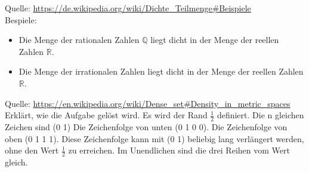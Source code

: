 \documentclass[11pt]{article}
\newenvironment{reflection}[2][Reflection]{\begin{trivlist}
\item[\hskip \labelsep {\bfseries #1}\hskip \labelsep {\bfseries #2.}]}{\end{trivlist}}
\begin{document}
\begin{reflection}{1.2}
Quelle: 
\url{https://de.wikipedia.org/wiki/Dichte_Teilmenge#Beispiele}\\
Bespiele:
\begin{itemize}
\item  Die Menge der rationalen Zahlen $\mathbb{Q}$ liegt dicht in der Menge der reellen Zahlen $\mathbb{R}$.
\item  Die Menge der irrationalen Zahlen liegt dicht in der Menge der reellen Zahlen $\mathbb{R}$.
\end{itemize}

Quelle: 
\url{https://en.wikipedia.org/wiki/Dense_set#Density_in_metric_spaces}\\
Erklärt, wie die Aufgabe gelöst wird.
Es wird der Rand $\frac{1}{2}$ definiert. Die n gleichen Zeichen sind (0 1)
Die Zeichenfolge von unten (0 1 0 0). Die Zeichenfolge von oben (0 1 1 1). Diese Zeichenfolge kann mit (0 1) beliebig lang verlängert werden, ohne den Wert $\frac{1}{2}$ zu erreichen. 
Im Unendlichen sind die drei Reihen vom Wert gleich.
\end{reflection}
\end{document}
